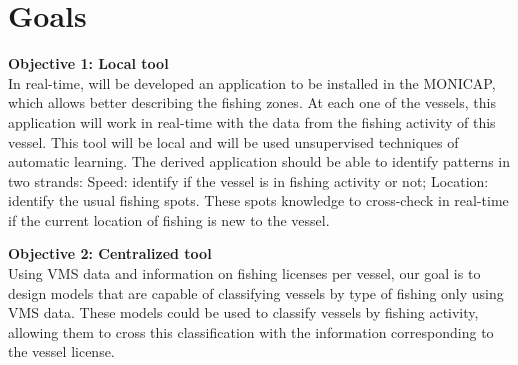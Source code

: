 


\section{Goals} %
\label{sec:objectives}

\textbf{Objective 1: Local tool} \\
In real-time, will be developed an application to be installed in the MONICAP, which allows better describing the fishing zones. At each one of the vessels, this application will work in real-time with the data from the fishing activity of this vessel. This tool will be local and will be used unsupervised techniques of automatic learning.
The derived application should be able to identify patterns in two strands:
Speed: identify if the vessel is in fishing activity or not;
Location: identify the usual fishing spots. These spots knowledge to cross-check in real-time if the current location of fishing is new to the vessel.

\textbf{Objective 2: Centralized tool} \\
Using VMS data and information on fishing licenses per vessel, our goal is to design models that are capable of classifying vessels by type of fishing only using VMS data. These models could be used to classify vessels by fishing activity, allowing them to cross this classification with the information corresponding to the vessel license.


